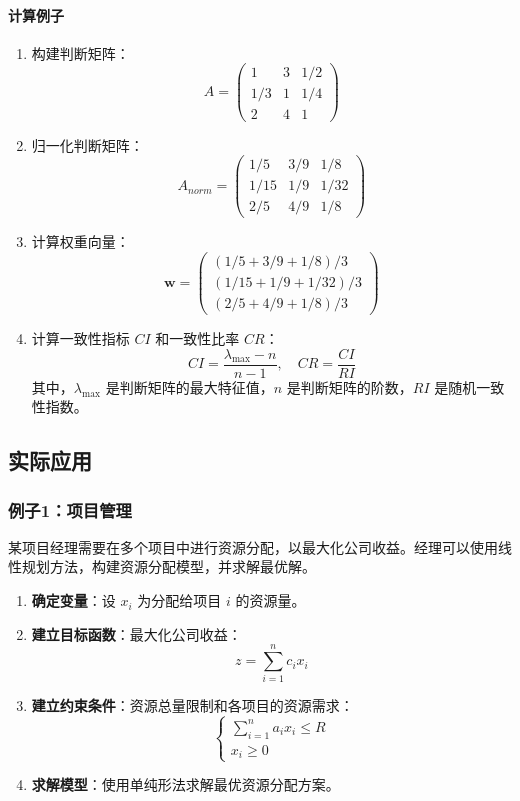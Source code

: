 \documentclass[UTF8]{ctexart}
\begin{document}
\paragraph{计算例子}
\begin{enumerate}
    \item 构建判断矩阵：
    \[
    A = \begin{pmatrix}
    1 & 3 & 1/2 \\
    1/3 & 1 & 1/4 \\
    2 & 4 & 1
    \end{pmatrix}
    \]
    \item 归一化判断矩阵：
    \[
    A_{norm} = \begin{pmatrix}
    1/5 & 3/9 & 1/8 \\
    1/15 & 1/9 & 1/32 \\
    2/5 & 4/9 & 1/8
    \end{pmatrix}
    \]
    \item 计算权重向量：
    \[
    \mathbf{w} = \begin{pmatrix}
    (1/5 + 3/9 + 1/8)/3 \\
    (1/15 + 1/9 + 1/32)/3 \\
    (2/5 + 4/9 + 1/8)/3
    \end{pmatrix}
    \]
    \item 计算一致性指标 \(CI\) 和一致性比率 \(CR\)：
    \[
    CI = \frac{\lambda_{\max} - n}{n-1}, \quad CR = \frac{CI}{RI}
    \]
    其中，\(\lambda_{\max}\) 是判断矩阵的最大特征值，\(n\) 是判断矩阵的阶数，\(RI\) 是随机一致性指数。

\end{enumerate}

\subsection {实际应用}
\subsubsection {例子1：项目管理}
某项目经理需要在多个项目中进行资源分配，以最大化公司收益。经理可以使用线性规划方法，构建资源分配模型，并求解最优解。
\begin{enumerate}
    \item \textbf{确定变量}：设 \( x_i \) 为分配给项目 \( i \) 的资源量。
    \item \textbf{建立目标函数}：最大化公司收益：
    \[
    z = \sum_{i=1}^{n} c_i x_i
    \]
    \item \textbf{建立约束条件}：资源总量限制和各项目的资源需求：
    \[
    \begin{cases}
    \sum_{i=1}^{n} a_i x_i \leq R \\
    x_i \geq 0
    \end{cases}
    \]
    \item \textbf{求解模型}：使用单纯形法求解最优资源分配方案。
\end{enumerate}
\end{document}
